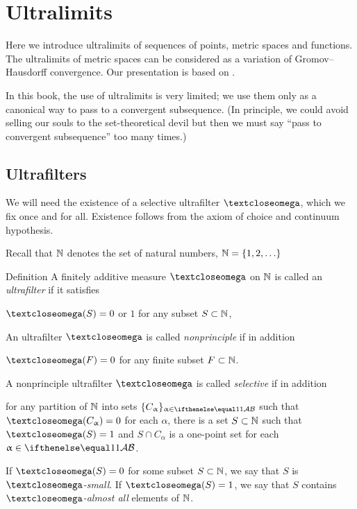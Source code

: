\chapter{Ultralimits}

Here we introduce ultralimits of sequences of points, metric spaces and functions.
The ultralimits of metric spaces can be considered as a variation of Gromov--Hausdorff convergence.
Our presentation is based on \cite{kleiner-leeb}.

In this book, the use of ultralimits is very limited; 
we use them only as a canonical way to pass to a convergent subsequence.
(In principle, we could avoid selling our souls 
to the set-theoretical devil but then we must say ``pass to convergent subsequence'' too many times.)

\section{Ultrafilters}

We will need the existence of a 
selective ultrafilter $\o$,
which we fix once and for all.
Existence follows from the axiom of choice and continuum hypothesis.

Recall that $\mathbb{N}$ denotes the set of natural numbers, $\NN=\{1,2,\dots\}$

\begin{thm}{Definition}
A finitely additive measure $\o$ 
on  $\mathbb{N}$ 
is called an \emph{ultrafilter} if it satisfies 
\begin{subthm}{}
$\o(S)=0$ or $1$ for any subset $S\subset \NN$,
\end{subthm}
An ultrafilter $\o$ is called 
\emph{nonprinciple} if in addition 
\begin{subthm}{}
$\o(F)=0$ for any finite subset $F\subset \NN$.
\end{subthm}
A nonprinciple ultrafilter $\o$ is called 
\emph{selective} if in addition 
\begin{subthm}{}
for any partition of $\mathbb{N}$ into sets $\{C_\alpha\}_{\alpha\in\IndexSet}$ such that $\o(C_\alpha)=0$ for each $\alpha$, 
there is a set $S\subset \NN$ such that $\o(S)=1$ and $S\cap C_\alpha$ is a one-point set for each $\alpha\in\IndexSet$.
\end{subthm}
\end{thm}

If $\o(S)=0$ for some subset $S\subset \NN$,
we say that $S$ is \emph{$\o$-small}. 
If $\o(S)=1$, we say that $S$ contains \emph{$\o$-almost all} elements of $\mathbb{N}$.

